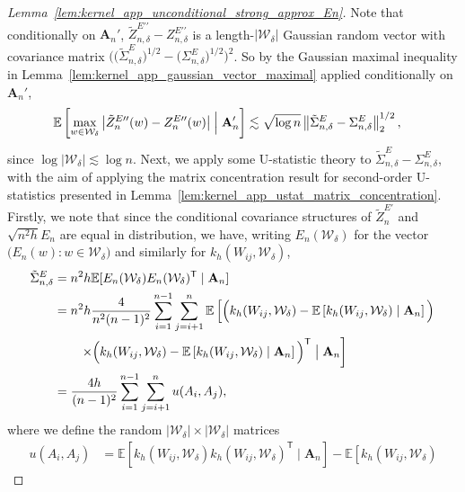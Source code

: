 \documentclass[11pt,lof]{puthesis}
\newcommand{\E}{\ensuremath{\mathbb{E}}}
\newcommand{\bA}{\ensuremath{\mathbf{A}}}
\newcommand{\cW}{\ensuremath{\mathcal{W}}}
\newcommand{\T}{\ensuremath{\mathsf{T}}}
\newcommand{\dprime}{\ensuremath{\prime\prime}}
\theoremstyle{break}
\theoremstyle{proof}
\newtheorem{proof}{Proof}
\begin{document}
\begin{proof}[Lemma~\ref{lem:kernel_app_unconditional_strong_approx_En}]
  Note that conditionally on $\bA_n'$,
  $\tilde Z_{n,\delta}^{E\dprime} - Z_{n,\delta}^{E\dprime}$
  is a length-$|\cW_\delta|$
  Gaussian random vector with covariance matrix
  $\big(
    \big(\tilde \Sigma^E_{n,\delta}\big)^{1/2}
    - \big(\Sigma^E_{n,\delta}\big)^{1/2}
  \big)^2$.
  So by the Gaussian maximal inequality in
  Lemma~\ref{lem:kernel_app_gaussian_vector_maximal}
  applied conditionally on $\bA_n'$,
  \begin{align*}
    \E\left[
      \max_{w \in \cW_\delta}
      \big|\tilde Z_n^{E\dprime}(w) - Z_n^{E\dprime}(w)\big|
      \Bigm| \bA_n'
    \right]
    &\lesssim
    \sqrt{\log n}
    \left\|
    \tilde\Sigma^E_{n,\delta}
    - \Sigma^E_{n,\delta}
    \right\|_2^{1/2},
  \end{align*}
  since $\log |\cW_\delta| \lesssim \log n$.
  Next, we apply some U-statistic theory to
  $\tilde\Sigma^E_{n,\delta} - \Sigma^E_{n,\delta}$,
  with the aim of applying the
  matrix concentration result
  for second-order U-statistics
  presented in Lemma~\ref{lem:kernel_app_ustat_matrix_concentration}.
  Firstly, we note that
  since
  the conditional covariance structures of
  $\tilde Z_n^{E\prime}$ and $\sqrt{n^2h} E_n$
  are equal in distribution,
  we have,
  writing $E_n(\cW_\delta)$
  for the vector $\big(E_n(w) : w \in \cW_\delta\big)$
  and similarly for $k_h(W_{i j}, \cW_\delta)$,
  \begin{align*}
    \tilde\Sigma^E_{n,\delta}
    &=
    n^2h \E[E_n(\cW_\delta) E_n(\cW_\delta)^\T \mid \bA_n] \\
    &=
    n^2h
    \frac{4}{n^2(n-1)^2}
    \sum_{i=1}^{n-1}
    \sum_{j=i+1}^{n}
    \E\left[
      \Big(
        k_h(W_{i j}, \cW_\delta)
        - \E\left[
          k_h(W_{i j}, \cW_\delta)
          \mid \bA_n
        \right]
      \Big)
      \right. \\
      &\qquad\left.
      \times\Big(
        k_h(W_{i j}, \cW_\delta)
        - \E\left[
          k_h(W_{i j}, \cW_\delta)
          \mid \bA_n
        \right]
      \Big)^\T
      \bigm\vert \bA_n
    \right] \\
    &=
    \frac{4h}{(n-1)^2}
    \sum_{i=1}^{n-1}
    \sum_{j=i+1}^{n}
    u(A_i, A_j),
  \end{align*}
  where we
  define the random
  $|\cW_\delta| \times |\cW_\delta|$
  matrices
  \begin{align*}
    u(A_i, A_j)
    &=
    \E\!\left[
      k_h(W_{i j}, \cW_\delta)
      k_h(W_{i j}, \cW_\delta)^\T
      \mid \bA_n
    \right]
    -
    \E\!\left[
      k_h(W_{i j}, \cW_\delta)

\end{align*}
\end{proof}
\end{document}
